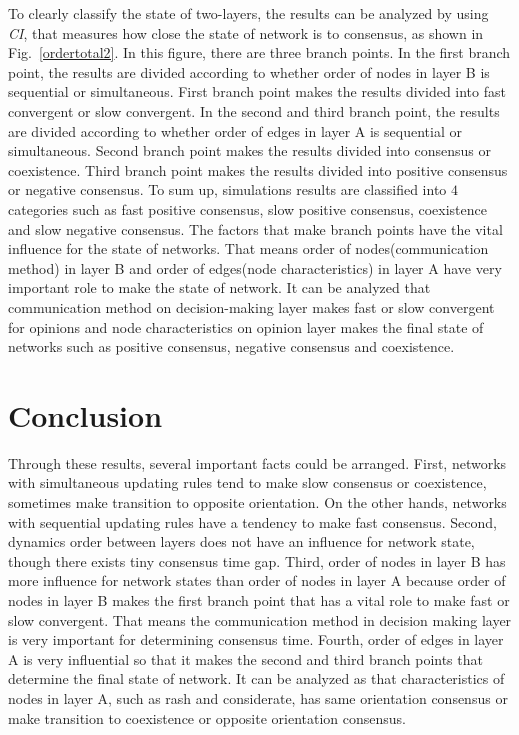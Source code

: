 To clearly classify the state of two-layers, the results can be analyzed by using \textit{CI}, that measures how close the state of network is to consensus, as shown in Fig.~\ref{ordertotal2}. In this figure, there are three branch points. In the first branch point, the results are divided according to whether order of nodes in layer B is sequential or simultaneous. First branch point makes the results divided into fast convergent or slow convergent. In the second and third branch point, the results are divided according to whether order of edges in layer A is sequential or simultaneous. Second branch point makes the results divided into consensus or coexistence. Third branch point makes the results divided into positive consensus or negative consensus. To sum up, simulations results are classified into $4$ categories such as fast positive consensus, slow positive consensus, coexistence and slow negative consensus. The factors that make branch points have the vital influence for the state of networks. That means order of nodes(communication method) in layer B and order of edges(node characteristics) in layer A have very important role to make the state of network. It can be analyzed that communication method on decision-making layer makes fast or slow convergent for opinions and node characteristics on opinion layer makes the final state of networks such as positive consensus, negative consensus and coexistence. 

\section{Conclusion}
Through these results, several important facts could be arranged. First, networks with simultaneous updating rules tend to make slow consensus or coexistence, sometimes make transition to opposite orientation. On the other hands, networks with sequential updating rules have a tendency to make fast consensus. Second, dynamics order between layers does not have an influence for network state, though there exists tiny consensus time gap. Third, order of nodes in layer B has more influence for network states than order of nodes in layer A because order of nodes in layer B makes the first branch point that has a vital role to make fast or slow convergent. That means the communication method in decision making layer is very important for determining consensus time. Fourth, order of edges in layer A is very influential so that it makes the second and third branch points that determine the final state of network. It can be analyzed as that characteristics of nodes in layer A, such as rash and considerate, has same orientation consensus or make transition to coexistence or opposite orientation consensus.




